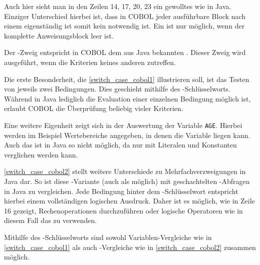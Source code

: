 Auch hier sieht man in den Zeilen 14, 17, 20, 23 ein gewolltes  wie in Java. Einziger Unterschied hierbei ist, dass in COBOL jeder ausführbare Block nach einem  eigenständig ist somit kein  notwendig ist. Ein  ist nur möglich, wenn der komplette Anweisungsblock leer ist. 

Der -Zweig entspricht in COBOL dem aus Java bekannten . Dieser Zweig wird ausgeführt, wenn die Kriterien keines anderen zutreffen.

Die erste Besonderheit, die \autoref{switch_case_cobol1} illustrieren soll, ist das Testen von jeweils zwei Bedingungen. Dies geschieht mithilfe des -Schlüsselworts. Während in Java lediglich die Evaluation einer einzelnen Bedingung möglich ist, erlaubt COBOL die Überprüfung beliebig vieler Kriterien.


Eine weitere Eigenheit zeigt sich in der Auswertung der Variable \texttt{AGE}. Hierbei werden im Beispiel Wertebereiche angegeben, in denen die Variable liegen kann. Auch das ist in Java so nicht möglich, da nur mit Literalen und Konstanten verglichen werden kann.

\autoref{switch_case_cobol2} stellt weitere Unterschiede zu Mehrfachverzweigungen in Java dar. So ist diese -Variante (auch als  möglich) mit geschachtelten -Abfragen in Java zu vergleichen. Jede Bedingung hinter dem -Schlüsselwort entspricht hierbei einem vollständigen logischen Ausdruck. Daher ist es möglich, wie in Zeile 16 gezeigt, Rechenoperationen durchzuführen oder logische Operatoren wie in diesem Fall das  zu verwenden. 


Mithilfe des -Schlüsselworts sind sowohl Variablen-Vergleiche wie in \autoref{switch_case_cobol1} als auch -Vergleiche wie in \autoref{switch_case_cobol2} zusammen möglich.